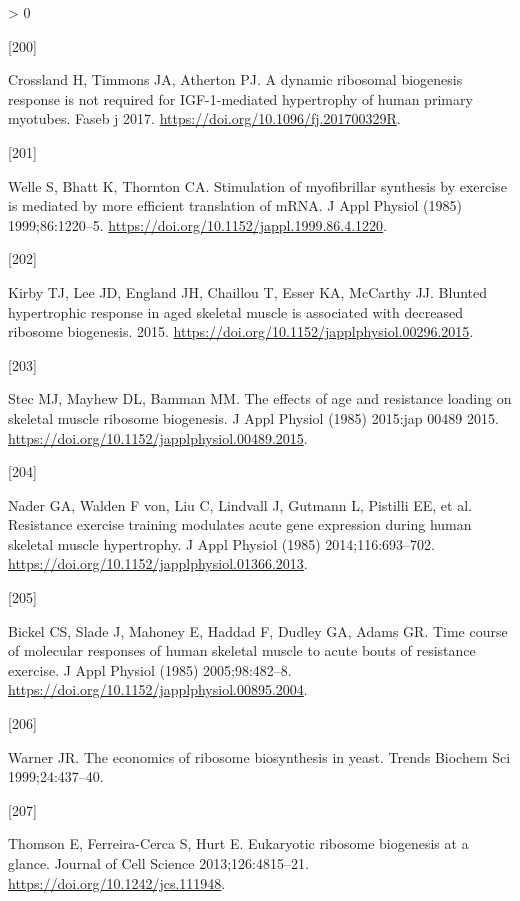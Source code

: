 \documentclass[twoside,10pt]{gihclass} %
\newlength{\cslhangindent}
\newlength{\csllabelwidth}
\newenvironment{CSLReferences}[3] %
 {%
  \setlength{\parindent}{0pt}
  \ifodd #1 \everypar{\setlength{\hangindent}{\cslhangindent}}\ignorespaces\fi
  \ifnum #2 > 0
  \setlength{\parskip}{#2\baselineskip}
  \fi
 }%
 {}
\newcommand{\CSLLeftMargin}[1]{\parbox[t]{\maxof{\widthof{#1}}{\csllabelwidth}}{#1}}
\newcommand{\CSLRightInline}[1]{\parbox[t]{\linewidth}{#1}}
\begin{document}
\begin{CSLReferences}{0}{0}
\leavevmode\hypertarget{ref-RN1929}{}%
\CSLLeftMargin{{[}200{]} }
\CSLRightInline{Crossland H, Timmons JA, Atherton PJ. A dynamic ribosomal biogenesis response is not required for IGF-1-mediated hypertrophy of human primary myotubes. Faseb j 2017. \url{https://doi.org/10.1096/fj.201700329R}.}

\leavevmode\hypertarget{ref-RN2155}{}%
\CSLLeftMargin{{[}201{]} }
\CSLRightInline{Welle S, Bhatt K, Thornton CA. Stimulation of myofibrillar synthesis by exercise is mediated by more efficient translation of mRNA. J Appl Physiol (1985) 1999;86:1220--5. \url{https://doi.org/10.1152/jappl.1999.86.4.1220}.}

\leavevmode\hypertarget{ref-RN1631}{}%
\CSLLeftMargin{{[}202{]} }
\CSLRightInline{Kirby TJ, Lee JD, England JH, Chaillou T, Esser KA, McCarthy JJ. Blunted hypertrophic response in aged skeletal muscle is associated with decreased ribosome biogenesis. 2015. \url{https://doi.org/10.1152/japplphysiol.00296.2015}.}

\leavevmode\hypertarget{ref-RN1656}{}%
\CSLLeftMargin{{[}203{]} }
\CSLRightInline{Stec MJ, Mayhew DL, Bamman MM. The effects of age and resistance loading on skeletal muscle ribosome biogenesis. J Appl Physiol (1985) 2015:jap 00489 2015. \url{https://doi.org/10.1152/japplphysiol.00489.2015}.}

\leavevmode\hypertarget{ref-RN1037}{}%
\CSLLeftMargin{{[}204{]} }
\CSLRightInline{Nader GA, Walden F von, Liu C, Lindvall J, Gutmann L, Pistilli EE, et al. Resistance exercise training modulates acute gene expression during human skeletal muscle hypertrophy. J Appl Physiol (1985) 2014;116:693--702. \url{https://doi.org/10.1152/japplphysiol.01366.2013}.}

\leavevmode\hypertarget{ref-RN1520}{}%
\CSLLeftMargin{{[}205{]} }
\CSLRightInline{Bickel CS, Slade J, Mahoney E, Haddad F, Dudley GA, Adams GR. Time course of molecular responses of human skeletal muscle to acute bouts of resistance exercise. J Appl Physiol (1985) 2005;98:482--8. \url{https://doi.org/10.1152/japplphysiol.00895.2004}.}

\leavevmode\hypertarget{ref-RN1920}{}%
\CSLLeftMargin{{[}206{]} }
\CSLRightInline{Warner JR. The economics of ribosome biosynthesis in yeast. Trends Biochem Sci 1999;24:437--40.}

\leavevmode\hypertarget{ref-RN1940}{}%
\CSLLeftMargin{{[}207{]} }
\CSLRightInline{Thomson E, Ferreira-Cerca S, Hurt E. Eukaryotic ribosome biogenesis at a glance. Journal of Cell Science 2013;126:4815--21. \url{https://doi.org/10.1242/jcs.111948}.}


\end{CSLReferences}
\end{document}
